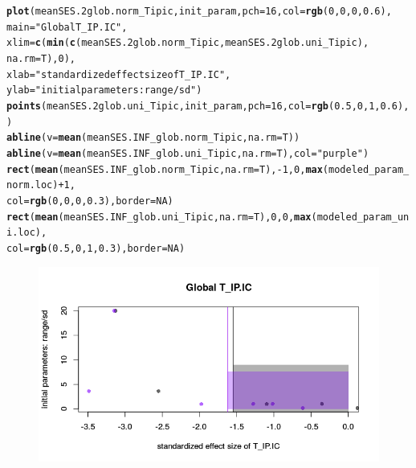 \documentclass[12pt]{article}\usepackage[]{graphicx}\usepackage[]{color}
\makeatletter
\def\maxwidth{ %
  \ifdim\Gin@nat@width>\linewidth
    \linewidth
  \else
    \Gin@nat@width
  \fi
}
\newcommand{\hlnum}[1]{\textcolor[rgb]{0.686,0.059,0.569}{#1}}%
\newcommand{\hlstr}[1]{\textcolor[rgb]{0.192,0.494,0.8}{#1}}%
\newcommand{\hlopt}[1]{\textcolor[rgb]{0,0,0}{#1}}%
\newcommand{\hlstd}[1]{\textcolor[rgb]{0.345,0.345,0.345}{#1}}%
\newcommand{\hlkwc}[1]{\textcolor[rgb]{0.333,0.667,0.333}{#1}}%
\newcommand{\hlkwd}[1]{\textcolor[rgb]{0.737,0.353,0.396}{\textbf{#1}}}%
\newenvironment{kframe}{%
 \def\at@end@of@kframe{}%
 \ifinner\ifhmode%
  \def\at@end@of@kframe{\end{minipage}}%
  \begin{minipage}{\columnwidth}%
 \fi\fi%
 \def\FrameCommand##1{\hskip\@totalleftmargin \hskip-\fboxsep
 \colorbox{shadecolor}{##1}\hskip-\fboxsep
     \hskip-\linewidth \hskip-\@totalleftmargin \hskip\columnwidth}%
 \MakeFramed {\advance\hsize-\width
   \@totalleftmargin\z@ \linewidth\hsize
   \@setminipage}}%
 {\par\unskip\endMakeFramed%
 \at@end@of@kframe}
\newenvironment{knitrout}{}{} %
\makeatother
\begin{document}
\begin{knitrout}\small
{}\color{fgcolor}\begin{kframe}
\begin{alltt}
\hlkwd{plot}\hlstd{(meanSES.2glob.norm_Tipic, init_param,} \hlkwc{pch} \hlstd{=} \hlnum{16}\hlstd{,} \hlkwc{col} \hlstd{=} \hlkwd{rgb}\hlstd{(}\hlnum{0}\hlstd{,} \hlnum{0}\hlstd{,} \hlnum{0}\hlstd{,} \hlnum{0.6}\hlstd{),}
     \hlkwc{main} \hlstd{=} \hlstr{"Global T_IP.IC"}\hlstd{,}
     \hlkwc{xlim} \hlstd{=} \hlkwd{c}\hlstd{(}\hlkwd{min}\hlstd{(}\hlkwd{c}\hlstd{(meanSES.2glob.norm_Tipic, meanSES.2glob.uni_Tipic),}
            \hlkwc{na.rm} \hlstd{= T),} \hlnum{0}\hlstd{),}
     \hlkwc{xlab} \hlstd{=} \hlstr{"standardized effect size of T_IP.IC"}\hlstd{,}
     \hlkwc{ylab} \hlstd{=} \hlstr{"initial parameters: range/sd"}\hlstd{)}
\hlkwd{points}\hlstd{(meanSES.2glob.uni_Tipic, init_param,} \hlkwc{pch} \hlstd{=} \hlnum{16}\hlstd{,} \hlkwc{col} \hlstd{=} \hlkwd{rgb}\hlstd{(}\hlnum{0.5}\hlstd{,} \hlnum{0}\hlstd{,} \hlnum{1}\hlstd{,} \hlnum{0.6}\hlstd{),)}
\hlkwd{abline}\hlstd{(}\hlkwc{v} \hlstd{=} \hlkwd{mean}\hlstd{(meanSES.INF_glob.norm_Tipic,} \hlkwc{na.rm} \hlstd{= T))}
\hlkwd{abline}\hlstd{(}\hlkwc{v} \hlstd{=} \hlkwd{mean}\hlstd{(meanSES.INF_glob.uni_Tipic,} \hlkwc{na.rm} \hlstd{= T),} \hlkwc{col} \hlstd{=} \hlstr{"purple"}\hlstd{)}
\hlkwd{rect}\hlstd{(}\hlkwd{mean}\hlstd{(meanSES.INF_glob.norm_Tipic,} \hlkwc{na.rm} \hlstd{= T),} \hlopt{-}\hlnum{1}\hlstd{,} \hlnum{0}\hlstd{,} \hlkwd{max}\hlstd{(modeled_param_norm.loc)} \hlopt{+} \hlnum{1}\hlstd{,}
     \hlkwc{col} \hlstd{=} \hlkwd{rgb}\hlstd{(}\hlnum{0}\hlstd{,} \hlnum{0}\hlstd{,} \hlnum{0}\hlstd{,} \hlnum{0.3}\hlstd{),} \hlkwc{border} \hlstd{=} \hlnum{NA}\hlstd{)}
\hlkwd{rect}\hlstd{(}\hlkwd{mean}\hlstd{(meanSES.INF_glob.uni_Tipic,} \hlkwc{na.rm} \hlstd{= T),} \hlnum{0}\hlstd{,} \hlnum{0}\hlstd{,} \hlkwd{max}\hlstd{(modeled_param_uni.loc),}
     \hlkwc{col} \hlstd{=} \hlkwd{rgb}\hlstd{(}\hlnum{0.5}\hlstd{,} \hlnum{0}\hlstd{,} \hlnum{1}\hlstd{,} \hlnum{0.3}\hlstd{),} \hlkwc{border} \hlstd{=} \hlnum{NA}\hlstd{)}
\end{alltt}
\end{kframe}\begin{figure}

{\centering \includegraphics[width=\maxwidth]{figure/Internal_filter_Results_plots_initial_param-1} 

}
\end{figure}
\end{knitrout}
\end{document}
